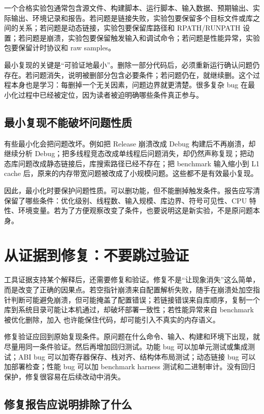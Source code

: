 一个合格实验包通常包含源文件、构建脚本、运行脚本、输入数据、预期输出、实际输出、环境记录和报告。若问题是链接失败，实验包要保留多个目标文件或库之间的关系；若问题是动态链接，实验包要保留库路径和 RPATH/RUNPATH 设置；若问题是崩溃，实验包要保留触发输入和调试命令；若问题是性能异常，实验包要保留计时协议和 raw samples。

最小复现的关键是“可验证地最小”。删除一部分代码后，必须重新运行确认问题仍存在。若问题消失，说明被删部分包含必要条件；若问题仍在，就继续删。这个过程本身也是学习：每删掉一个无关因素，问题边界就更清楚。很多复杂 bug 在最小化过程中已经被定位，因为读者被迫明确哪些条件真正参与。

\subsection{最小复现不能破坏问题性质}

有些最小化会把问题改坏。例如把 Release 崩溃改成 Debug 构建后不再崩溃，却继续分析 Debug；把多线程竞态改成单线程后问题消失，却仍然声称复现；把动态库问题改成静态链接后，库搜索路径已经不存在；把 benchmark 输入缩小到 L1 cache 后，原来的内存带宽问题被改成了小规模问题。这些都不是有效最小复现。

因此，最小化时要保护问题性质。可以删功能，但不能删掉触发条件。报告应写清保留了哪些条件：优化级别、线程数、输入规模、库边界、符号可见性、CPU 特性、环境变量。若为了方便观察改变了条件，也要说明这是新实验，不是原问题本身。

\section{从证据到修复：不要跳过验证}

工具证据支持某个解释后，还需要修复和验证。修复不是“让现象消失”这么简单，而是改变了正确的因果点。若空指针崩溃来自配置解析失败，随手在崩溃处加空指针判断可能避免崩溃，但可能掩盖了配置错误；若链接错误来自库顺序，复制一个库到系统目录可能让本机通过，却破坏部署一致性；若性能异常来自 benchmark 被优化删除，加入  也许能保住代码，却可能引入不真实的内存语义。

修复验证应回到原始复现条件。原问题在什么命令、输入、构建和环境下出现，就尽量用同一条件验证。然后再增加回归测试。功能 bug 可以加单元测试或集成测试；ABI bug 可以加寄存器保存、栈对齐、结构体布局测试；动态链接 bug 可以加部署检查；性能 bug 可以加 benchmark harness 测试和二进制审计。没有回归保护，修复很容易在后续改动中消失。

\subsection{修复报告应说明排除了什么}


